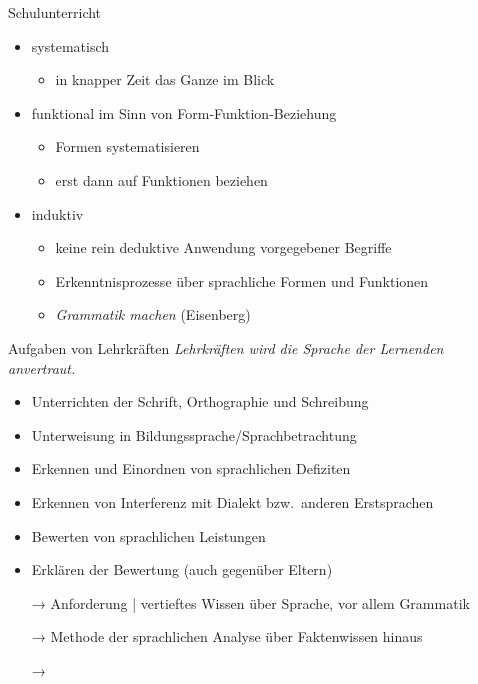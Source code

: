 \begin{frame}
  {Schulunterricht}
  \onslide<+->
  \begin{itemize}[<+->]
    \item \alert{systematisch}
      \begin{itemize}
        \item in knapper Zeit das Ganze im Blick
      \end{itemize}
      \Zeile
    \item funktional im Sinn von \alert{Form-Funktion-Beziehung}
      \begin{itemize}
        \item Formen systematisieren
        \item erst dann auf Funktionen beziehen
      \end{itemize}
      \Zeile
    \item \alert{induktiv}
      \begin{itemize}
        \item keine rein deduktive Anwendung vorgegebener Begriffe
        \item Erkenntnisprozesse über sprachliche Formen und Funktionen
        \item \alert{\textit{Grammatik machen}} (Eisenberg)
      \end{itemize}
  \end{itemize}
\end{frame}

\begin{frame}
  {Aufgaben von Lehrkräften}
  \onslide<+->
  \onslide<+->
  \alert{\textit{Lehrkräften wird die Sprache der Lernenden anvertraut.}} \\
  \Zeile
  \begin{itemize}[<+->]
    \item Unterrichten der Schrift, Orthographie und Schreibung
    \item Unterweisung in Bildungssprache\slash Sprachbetrachtung
    \item Erkennen und \alert{Einordnen} von \alert{sprachlichen Defiziten}
    \item Erkennen von \alert{Interferenz mit Dialekt bzw.\ anderen Erstsprachen}
    \item \alert{Bewerten} von sprachlichen Leistungen
    \item \alert{Erklären} der Bewertung (auch gegenüber Eltern)
      \Zeile
    \item[→] Anforderung | vertieftes Wissen über Sprache, vor allem Grammatik
    \item[→] Methode der sprachlichen Analyse über Faktenwissen hinaus
    \item[→] 
  \end{itemize}
\end{frame}


